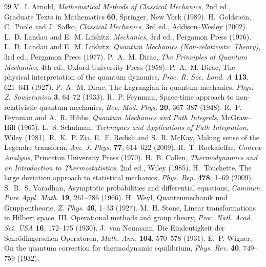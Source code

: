 \documentclass[11pt,a4paper]{article}
\theoremstyle{plain}
\theoremstyle{definition}
\theoremstyle{remark}
\begin{document}
\begin{thebibliography}{99}
 V.~I. Arnold, \emph{Mathematical Methods of Classical Mechanics}, 2nd ed., Graduate Texts in Mathematics \textbf{60}, Springer, New York (1989).
 H.~Goldstein, C.~Poole and J.~Safko, \emph{Classical Mechanics}, 3rd ed., Addison--Wesley (2002).
 L.~D. Landau and E.~M. Lifshitz, \emph{Mechanics}, 3rd ed., Pergamon Press (1976).
 L.~D. Landau and E.~M. Lifshitz, \emph{Quantum Mechanics (Non-relativistic Theory)}, 3rd ed., Pergamon Press (1977).
 P.~A.~M. Dirac, \emph{The Principles of Quantum Mechanics}, 4th ed., Oxford University Press (1958).
 P.~A.~M. Dirac, The physical interpretation of the quantum dynamics, \emph{Proc. R. Soc. Lond. A} \textbf{113}, 621--641 (1927).
 P.~A.~M. Dirac, The Lagrangian in quantum mechanics, \emph{Phys. Z. Sowjetunion} \textbf{3}, 64--72 (1933).
 R.~P. Feynman, Space-time approach to non-relativistic quantum mechanics, \emph{Rev. Mod. Phys.} \textbf{20}, 367--387 (1948).
 R.~P. Feynman and A.~R. Hibbs, \emph{Quantum Mechanics and Path Integrals}, McGraw--Hill (1965).
 L.~S. Schulman, \emph{Techniques and Applications of Path Integration}, Wiley (1981).
 R.~K.~P. Zia, E.~F. Redish and S.~R. McKay, Making sense of the Legendre transform, \emph{Am. J. Phys.} \textbf{77}, 614--622 (2009).
 R.~T. Rockafellar, \emph{Convex Analysis}, Princeton University Press (1970).
 H.~B. Callen, \emph{Thermodynamics and an Introduction to Thermostatistics}, 2nd ed., Wiley (1985).
 H.~Touchette, The large deviation approach to statistical mechanics, \emph{Phys. Rep.} \textbf{478}, 1--69 (2009).
 S.~R.~S. Varadhan, Asymptotic probabilities and differential equations, \emph{Commun. Pure Appl. Math.} \textbf{19}, 261--286 (1966).
 H.~Weyl, Quantenmechanik und Gruppentheorie, \emph{Z. Phys.} \textbf{46}, 1--33 (1927).
 M.~H. Stone, Linear transformations in Hilbert space. III. Operational methods and group theory, \emph{Proc. Natl. Acad. Sci. USA} \textbf{16}, 172--175 (1930).
 J.~von Neumann, Die Eindeutigkeit der Schr\"odingerschen Operatoren, \emph{Math. Ann.} \textbf{104}, 570--578 (1931).
 E.~P. Wigner, On the quantum correction for thermodynamic equilibrium, \emph{Phys. Rev.} \textbf{40}, 749--759 (1932).

\end{thebibliography}
\end{document}
